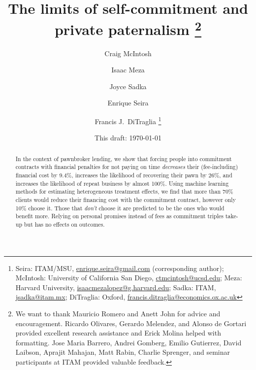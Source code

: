 \documentclass[oneside,11pt]{article}
\begin{document}
\title{The limits of self-commitment and private paternalism \thanks{We want to thank Mauricio Romero and Anett John for advice and encouragement. Ricardo Olivares, Gerardo Melendez, and Alonso de Gortari provided excellent research assistance and Erick Molina helped with formatting. Jose Maria Barrero, Andrei Gomberg, Emilio Gutierrez, David Laibson, Aprajit Mahajan, Matt Rabin, Charlie Sprenger, and seminar participants at ITAM provided valuable feedback.}}
\author{Craig McIntosh \and Isaac Meza \and Joyce Sadka \and Enrique Seira \and Francis J.\ DiTraglia   \thanks{Seira: ITAM/MSU, \url{enrique.seira@gmail.com} (corresponding author); McIntosh:  University of California San Diego, \url{ctmcintosh@ucsd.edu}; Meza: Harvard University, \url{isaacmezalopez@g.harvard.edu}; Sadka: ITAM, \url{jsadka@itam.mx}; DiTraglia: Oxford, \url{francis.ditraglia@economics.ox.ac.uk}} }
\date{This draft:  \today \\[2 cm]}



\maketitle
\thispagestyle{empty}
\begin{abstract}


In the context of pawnbroker lending, we show that forcing people into commitment contracts with financial penalties for not paying on time \textit{decreases} their (fee-including) financial cost by 9.4\%, increases the likelihood of recovering their pawn by 26\%, and increases the likelihood of repeat business by almost 100\%. Using machine learning methods for estimating heterogeneous treatment effects, we find that more than {70}\% clients would reduce their financing cost with the commitment contract, however only 10\% choose it. Those that \textit{don't} choose it are predicted to be the ones who would benefit more. Relying on personal promises instead of fees as commitment triples take-up but has no effects on outcomes.


\end{abstract}
\end{document}

